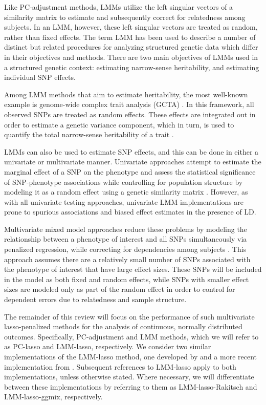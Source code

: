 Like PC-adjustment methods, LMMs utilize the left singular vectors of a similarity matrix to estimate and subsequently correct for relatedness among subjects. In an LMM, however, these left singular vectors are treated as random, rather than fixed effects. The term LMM has been used to describe a number of distinct but related procedures for analyzing structured genetic data which differ in their objectives and methods. There are two main objectives of LMMs used in a structured genetic context: estimating narrow-sense heritability, and estimating individual SNP effects.

Among LMM methods that aim to estimate heritability, the most well-known example is genome-wide complex trait analysis (GCTA) \citep{yang2011gcta}. In this framework, all observed SNPs are treated as random effects. These effects are integrated out in order to estimate a genetic variance component, which in turn, is used to quantify the total narrow-sense heritability of a trait \citep{yang2010common}.

LMMs can also be used to estimate SNP effects, and this can be done in either a univariate or multivariate manner. Univariate approaches attempt to estimate the marginal effect of a SNP on the phenotype and assess the statistical significance of SNP-phenotype associations while controlling for population structure by modeling it as a random effect using a genetic similarity matrix \citep{yu2006unified, kang2010variance, kang2008efficient}. However, as with all univariate testing approaches, univariate LMM implementations are prone to spurious associations and biased effect estimates in the presence of LD. 

Multivariate mixed model approaches reduce these problems by modeling the relationship between a phenotype of interest and all SNPs simultaneously via penalized regression, while correcting for dependencies among subjects \citep{Rakitsch2012, bhatnagar2019simultaneous}. This approach assumes there are a relatively small number of SNPs associated with the phenotype of interest that have large effect sizes. These SNPs will be included in the model as both fixed and random effects, while SNPs with smaller effect sizes are modeled only as part of the random effect in order to control for dependent errors due to relatedness and sample structure. 

The remainder of this review will focus on the performance of such multivariate lasso-penalized methods for the analysis of continuous, normally distributed outcomes. Specifically, PC-adjustment and LMM methods, which we will refer to as PC-lasso and LMM-lasso, respectively. We consider two similar implementations of the LMM-lasso method, one developed by \citet{Rakitsch2012} and a more recent implementation from \citet{bhatnagar2019simultaneous}. Subsequent references to LMM-lasso apply to both implementations, unless otherwise stated. Where necessary, we will differentiate between these implementations by referring to them as LMM-lasso-Rakitsch and LMM-lasso-ggmix, respectively. 

